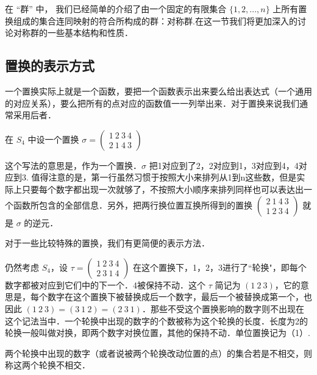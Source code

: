 

在 “群” 中， 我们已经简单的介绍了由一个固定的有限集合 $\{1, 2, ..., n\}$ 上所有置换组成的集合连同映射的符合所构成的群：对称群.在这一节我们将更加深入的讨论对称群的一些基本结构和性质．

\subsection{置换的表示方式}
一个置换实际上就是一个函数，要把一个函数表示出来要么给出表达式（一个通用的对应关系），要么把所有的点对应的函数值一一列举出来．对于置换来说我们通常采用后者．
\begin{example}{}
在 $S_4$ 中设一个置换 $\sigma=\begin{pmatrix}
1\ 2\ 3\ 4\\ 2\ 1\ 4\ 3
\end{pmatrix}$
\end{example}
这个写法的意思是，作为一个置换．$\sigma$ 把1对应到了2，2对应到1，3对应到4，4对应到3. 值得注意的是，第一行虽然习惯于按照大小来排列从1到n这些数，但是实际上只要每个数字都出现一次就够了，不按照大小顺序来排列同样也可以表达出一个函数所包含的全部信息．另外，把两行换位置互换所得到的置换
$\begin{pmatrix}
2\ 1\ 4\ 3\\ 1\ 2\ 3\ 4
\end{pmatrix}$
就是 $\sigma$ 的逆元．


对于一些比较特殊的置换，我们有更简便的表示方法．
\begin{example}{}
仍然考虑 $S_4$，设 $\tau=\begin{pmatrix}
1\ 2\ 3\ 4\\ 2\ 3\ 1\ 4
\end{pmatrix}$ 在这个置换下，1，2，3进行了“轮换"，即每个数字都被对应到它们中的下一个．4被保持不动．这个 $\tau$ 简记为 $(1\ 2\ 3)$，它的意思是，每个数字在这个置换下被替换成后一个数字，最后一个被替换成第一个，也因此 $(1\ 2\ 3)=(3\ 1\ 2)=(2\ 3\ 1)$．那些不受这个置换影响的数字则不出现在这个记法当中．一个轮换中出现的数字的个数被称为这个轮换的长度．长度为2的轮换一般叫做对换，即两个数字对换位置，其他的保持不动．单位置换记为（1）.
\end{example}

\begin{definition}{}
两个轮换中出现的数字（或者说被两个轮换改动位置的点）的集合若是不相交，则称这两个轮换不相交．
\end{definition}

